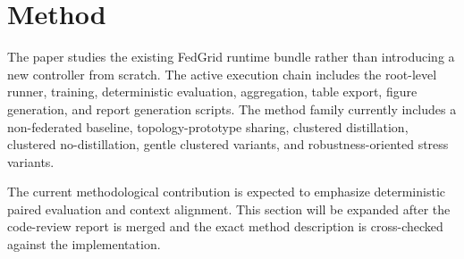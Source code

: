 \section{Method}

The paper studies the existing FedGrid runtime bundle rather than introducing a new controller from scratch. The active execution chain includes the root-level runner, training, deterministic evaluation, aggregation, table export, figure generation, and report generation scripts. The method family currently includes a non-federated baseline, topology-prototype sharing, clustered distillation, clustered no-distillation, gentle clustered variants, and robustness-oriented stress variants.

The current methodological contribution is expected to emphasize deterministic paired evaluation and context alignment. This section will be expanded after the code-review report is merged and the exact method description is cross-checked against the implementation.
